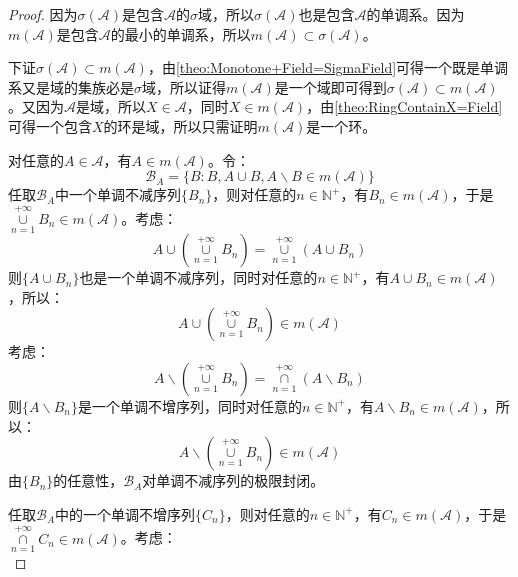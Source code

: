 \begin{proof}
	因为$\sigma(\mathscr{A})$是包含$\mathscr{A}$的$\sigma$域，所以$\sigma(\mathscr{A})$也是包含$\mathscr{A}$的单调系。因为$m(\mathscr{A})$是包含$\mathscr{A}$的最小的单调系，所以$m(\mathscr{A})\subset\sigma(\mathscr{A})$。\par
	下证$\sigma(\mathscr{A})\subset m(\mathscr{A})$，由\cref{theo:Monotone+Field=SigmaField}可得一个既是单调系又是域的集族必是$\sigma$域，所以证得$m(\mathscr{A})$是一个域即可得到$\sigma(\mathscr{A})\subset m(\mathscr{A})$。又因为$\mathscr{A}$是域，所以$X\in\mathscr{A}$，同时$X\in m(\mathscr{A})$，由\cref{theo:RingContainX=Field}可得一个包含$X$的环是域，所以只需证明$m(\mathscr{A})$是一个环。\par
	对任意的$A\in \mathscr{A}$，有$A\in m(\mathscr{A})$。令：
	\begin{equation*}
		\mathscr{B}_A=\{B:B,A\cup B,A\backslash B\in m(\mathscr{A})\}
	\end{equation*}
	任取$\mathscr{B}_A$中一个单调不减序列$\{B_n\}$，则对任意的$n\in\mathbb{N}^+$，有$B_n\in m(\mathscr{A})$，于是$\underset{n=1}{\overset{+\infty}{\cup}}B_n\in m(\mathscr{A})$。考虑：
	\begin{equation*}
		A\cup \left(\underset{n=1}{\overset{+\infty}{\cup}}B_n\right)
		=\underset{n=1}{\overset{+\infty}{\cup}}(A\cup B_n)
	\end{equation*}
	则$\{A\cup B_n\}$也是一个单调不减序列，同时对任意的$n\in\mathbb{N}^+$，有$A\cup B_n\in m(\mathscr{A})$，所以：
	\begin{equation*}
		A\cup\left(\underset{n=1}{\overset{+\infty}{\cup}}B_n\right)\in m(\mathscr{A})
	\end{equation*}
	考虑：
	\begin{equation*}
		A\backslash\left(\underset{n=1}{\overset{+\infty}{\cup}}B_n\right)
		=\underset{n=1}{\overset{+\infty}{\cap}}(A\backslash B_n)
	\end{equation*}
	则$\{A\backslash B_n\}$是一个单调不增序列，同时对任意的$n\in\mathbb{N}^+$，有$A\backslash B_n\in m(\mathscr{A})$，所以：
	\begin{equation*}
		A\backslash\left(\underset{n=1}{\overset{+\infty}{\cup}}B_n\right)\in m(\mathscr{A})
	\end{equation*}
	由$\{B_n\}$的任意性，$\mathscr{B}_A$对单调不减序列的极限封闭。\par
	任取$\mathscr{B}_A$中的一个单调不增序列$\{C_n\}$，则对任意的$n\in\mathbb{N}^+$，有$C_n\in m(\mathscr{A})$，于是$\underset{n=1}{\overset{+\infty}{\cap}}C_n\in m(\mathscr{A})$。考虑：
	\begin{equation*}

\end{equation*}
\end{proof}
